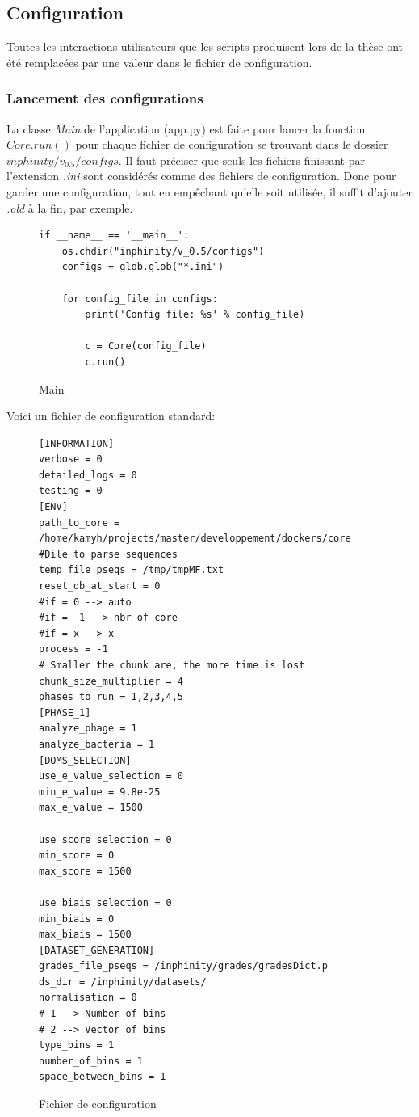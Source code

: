 \subsection{Configuration}
\label{ch:config}

Toutes les interactions utilisateurs que les scripts produisent lors de la thèse \thLeite ont été remplacées par une valeur dans le fichier de configuration.

\subsubsection{Lancement des configurations}

La classe \emph{Main} de l'application (app.py) est faite pour lancer la fonction \emph{$Core.run()$} pour chaque fichier de configuration se trouvant dans le dossier \emph{$inphinity/v_0.5/configs$}. Il faut préciser que seuls les fichiers finissant par l'extension \emph{.ini} sont considérés comme des fichiers de configuration. Donc pour garder une configuration, tout en empêchant qu'elle soit utilisée, il suffit d'ajouter \emph{.old} à la fin, par exemple.

\begin{figure}[H] 
\centering 
\begin{lstlisting}[frame=single]
if __name__ == '__main__':
    os.chdir("inphinity/v_0.5/configs")
    configs = glob.glob("*.ini")

    for config_file in configs:
        print('Config file: %s' % config_file)

        c = Core(config_file)
        c.run()
\end{lstlisting}
\caption[Main]{Main}
\label{fig:main} 
\end{figure}

\newpage
Voici un fichier de configuration standard:

\begin{figure}[H] 
\centering 
\begin{lstlisting}[frame=single]
[INFORMATION]
verbose = 0
detailed_logs = 0
testing = 0
[ENV]
path_to_core = /home/kamyh/projects/master/developpement/dockers/core
#Dile to parse sequences
temp_file_pseqs = /tmp/tmpMF.txt
reset_db_at_start = 0
#if = 0 --> auto
#if = -1 --> nbr of core
#if = x --> x
process = -1
# Smaller the chunk are, the more time is lost
chunk_size_multiplier = 4
phases_to_run = 1,2,3,4,5
[PHASE_1]
analyze_phage = 1
analyze_bacteria = 1
[DOMS_SELECTION]
use_e_value_selection = 0
min_e_value = 9.8e-25
max_e_value = 1500

use_score_selection = 0
min_score = 0
max_score = 1500

use_biais_selection = 0
min_biais = 0
max_biais = 1500
[DATASET_GENERATION]
grades_file_pseqs = /inphinity/grades/gradesDict.p
ds_dir = /inphinity/datasets/
normalisation = 0
# 1 --> Number of bins
# 2 --> Vector of bins
type_bins = 1
number_of_bins = 1
space_between_bins = 1
\end{lstlisting}
\caption[Fichier de configuration]{Fichier de configuration}
\label{fig:configFile} 
\end{figure}

